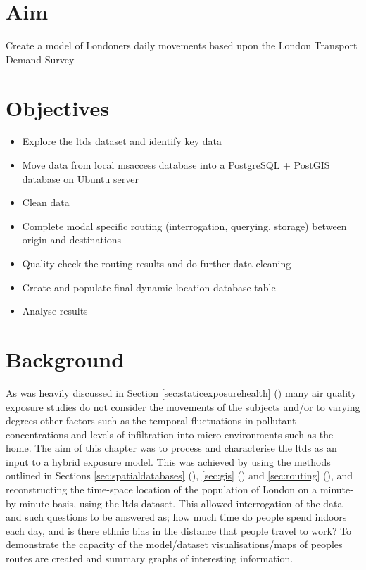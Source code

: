 \section{Aim}
\label{sec:1aim}

Create a model of Londoners daily movements based upon the London Transport Demand Survey

\section{Objectives}
\label{sec:1objectives}

\begin{itemize}
\item Explore the \gls{ltds} dataset and identify key data
\item Move data from local \gls{msaccess} database into a PostgreSQL + PostGIS database on Ubuntu server
\item Clean data
\item Complete modal specific routing (interrogation, querying, storage) between origin and destinations
\item Quality check the routing results and do further data cleaning
\item Create and populate final dynamic location database table
\item Analyse results
\end{itemize}

\section{Background}
\label{sec:1_background}

As was heavily discussed in Section \ref{sec:staticexposurehealth} () many air quality exposure studies do not consider the movements of the subjects and/or to varying degrees other factors such as the temporal fluctuations in pollutant concentrations and levels of infiltration into micro-environments such as the home. The aim of this chapter was to process and characterise the \gls{ltds} as an input to a hybrid exposure model. This was achieved by using the methods outlined in Sections \ref{sec:spatialdatabases} (), \ref{sec:gis} () and \ref{sec:routing} (), and reconstructing the time-space location of the population of London on a minute-by-minute basis, using the \gls{ltds} dataset. This allowed interrogation of the data and such questions to be answered as; how much time do people spend indoors each day, and is there ethnic bias in the distance that people travel to work? To demonstrate the capacity of the model/dataset visualisations/maps of peoples routes are created and summary graphs of interesting information.

